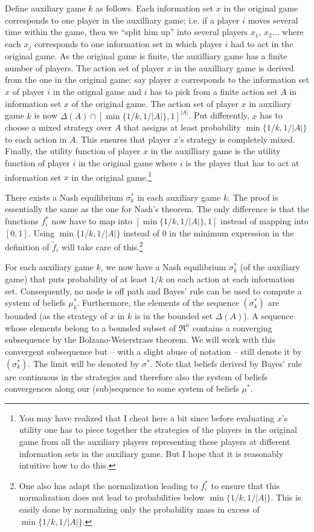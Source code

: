 \documentclass[a4paper,11pt]{article}
\begin{document}
Define auxiliary game $k$ as follows. Each information set $x$ in the original game corresponds to one player in the auxilliary game; i.e. if a player $i$ moves several time within the game, then we ``split him up'' into several players $x_1,\, x_2\dots$ where each $x_j$ corresponds to one information set in which player $i$ had to act in the original game. As the original game is finite, the auxilliary game has a finite number of players. The action set of player $x$ in the auxilliary game is derived from the one in the original game: say player $x$ corresponds to the information set $x$ of player $i$ in the orignal game and $i$ has to pick from a finite action set $A$ in information set $x$ of the original game. The action set of player $x$ in auxiliary game $k$ is now $\Delta(A)\cap [\min\{1/k,1/|A|\},1]^{|A|}$. Put differently, $x$ has to choose a mixed strategy over $A$ that assigns at least probability $\min\{1/k,1/|A|\}$ to each action in $A$. This ensures that player $x$'s strategy is completely mixed. Finally, the utility function of player $x$ in the auxilliary game is the utility function of player $i$ in the original game where $i$ is the player that has to act at information set $x$ in the original game.\footnote{You may have realized that I cheat here a bit since before evaluating $x$'s utility one has to piece together the strategies of the players in the original game from all the auxiliary players representing these players at different information sets in the auxiliary game. But I hope that it is reasonably intuitive how to do this.}

There exists a Nash equilibrium $\sigma_k^*$ in each auxiliary game $k$. The proof is essentially the same as the one for Nash's theorem. The only difference is that the functions $f_i^*$ now have to map into $[\min\{1/k,1/|A|\},1]$ instead of mapping into $[0,1]$. Using $\min\{1/k,1/|A|\}$ instead of $0$ in the minimum expression in the  definition of $\tilde{f}_i$ will take care of this.\footnote{One also has adapt the normalization leading to $f_i^*$ to ensure that this normalization does not lead to probabilities below $\min\{1/k,1/|A|\}$. This is easily done by normalizing only the probability mass in excess of $\min\{1/k,1/|A|\}$. }

For each auxiliary game $k$, we now have a Nash equilibrium $\sigma_k^*$ (of the auxiliary game) that puts probability of at least $1/k$ on each action at each information set. Consequently, no node is off path and Bayes' rule can be used to compute a system of beliefs $\mu_k^*$. Furthermore, the elements of the sequence $(\sigma_k^*)$ are bounded (as the strategy of $x$ in $k$ is in the bounded set $\Delta(A)$). A sequence whose elements belong to a bounded subset of $\Re^n$ contains a converging subsequence by the Bolzano-Weierstrass theorem. We will work with this convergent subsequence but -- with a slight abuse of notation -- still denote it by $(\sigma_k^*) $. The limit will be denoted by $\sigma^*$. Note that beliefs derived by Bayes' rule are continuous in the strategies and therefore also the system of beliefs convergences along our (sub)sequence to some system of beliefs $\mu^*$.
\end{document}
